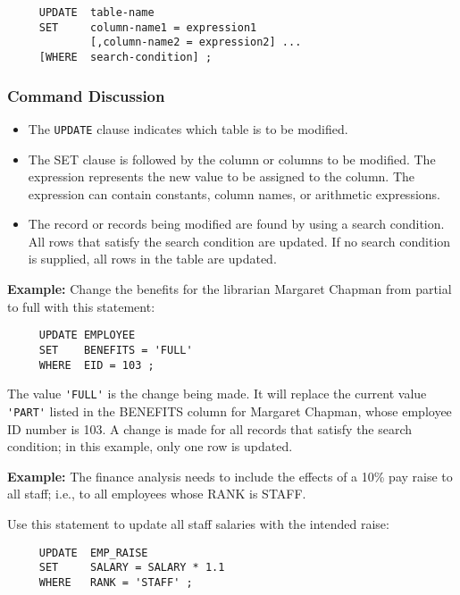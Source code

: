\begin{verbatim}
     UPDATE  table-name
     SET     column-name1 = expression1
             [,column-name2 = expression2] ...
     [WHERE  search-condition] ;
\end{verbatim}

\subsubsection{Command Discussion}

\begin{itemize}
\item The \verb`UPDATE` clause indicates which table is to be modified.

\item The SET clause is followed by the column or columns to be
modified.  The expression represents the new value to be assigned to
the column.  The expression can contain constants,
column names,
or arithmetic expressions.

\item The record or records being modified are found by using a search
condition.  All rows that satisfy the search condition are updated.
If no search condition is supplied, all rows in the table are updated.
\end{itemize}

{\bf Example:}
Change the benefits for the librarian Margaret Chapman from partial to
full with this statement:
\begin{verbatim}
     UPDATE EMPLOYEE
     SET    BENEFITS = 'FULL'
     WHERE  EID = 103 ;
\end{verbatim}

The value \verb`'FULL'` is the change being made.  It will replace the
current value \verb`'PART'` listed in the BENEFITS column for Margaret
Chapman, whose employee ID number is 103.  A change is made for all
records that satisfy the search condition; in this example, only one
row is updated.

{\bf Example:}
The finance analysis needs to include the effects of a 10\% pay raise
to all staff; i.e., to all employees whose RANK is STAFF.

Use this statement to update all staff salaries with the intended
raise:
\begin{verbatim}
     UPDATE  EMP_RAISE
     SET     SALARY = SALARY * 1.1
     WHERE   RANK = 'STAFF' ;
\end{verbatim}

